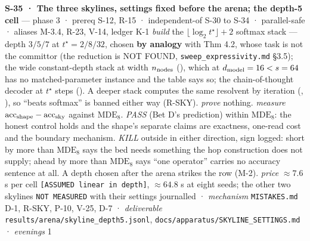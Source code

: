 \documentclass[11pt,a4paper]{article}
\theoremstyle{plain}
\theoremstyle{definition}
\theoremstyle{remark}
\begin{document}
\textbf{S-35 · The three skylines, settings fixed before the arena; the
depth-5 cell} --- phase 3 · prereq S-12, R-15 · independent-of S-30 to
S-34 · parallel-safe · aliases M-3.4, R-23, V-14, ledger K-1
\emph{build} the \(\lfloor\log_2 t^\star\rfloor+2\) softmax stack ---
depth \(3/5/7\) at \(t^\star=2/8/32\), chosen \textbf{by analogy} with
\citep{sanford-2024-logdepth} Thm 4.2, whose task is not the committor
(the reduction is NOT FOUND, \texttt{sweep\_expressivity.md} §3.5); the
wide constant-depth stack at width \(n_{\rm nodes}\)
(\citep{yehudai-2025-depthwidth}), which at \(d_{\rm model}=16<s=64\)
has no matched-parameter instance and the table says so; the
chain-of-thought decoder at \(t^\star\) steps
(\citep{merrill-2024-cot}). A deeper stack computes the same resolvent
by iteration (\citep{wang-2024-incontext-td},
\citep{xie-2026-softmax-rl}), so ``beats softmax'' is banned either way
(R-SKY). \emph{prove} nothing. \emph{measure}
\(\mathrm{acc}_{\rm shape}-\mathrm{acc}_{\rm sky}\) against
\(\mathrm{MDE}_8\). \emph{PASS} (Bet D's prediction) within
\(\mathrm{MDE}_8\): the honest control holds and the shape's separate
claims are exactness, one-read cost and the boundary mechanism.
\emph{KILL} outside in either direction, sign logged: short by more than
\(\mathrm{MDE}_8\) says the bed needs something the hop construction
does not supply; ahead by more than \(\mathrm{MDE}_8\) says ``one
operator'' carries no accuracy sentence at all. A depth chosen after the
arena strikes the row (M-2). \emph{price} \(\approx7.6\) s per cell
\texttt{{[}ASSUMED\ linear\ in\ depth{]}}, \(\approx64.8\) s at eight
seeds; the other two skylines \texttt{NOT\ MEASURED} with their settings
journalled · \emph{mechanism} \texttt{MISTAKES.md} D-1, R-SKY, P-10,
V-25, D-7 · \emph{deliverable}
\texttt{results/arena/skyline\_depth5.jsonl},
\texttt{docs/apparatus/SKYLINE\_SETTINGS.md} · \emph{evenings} 1
\end{document}
